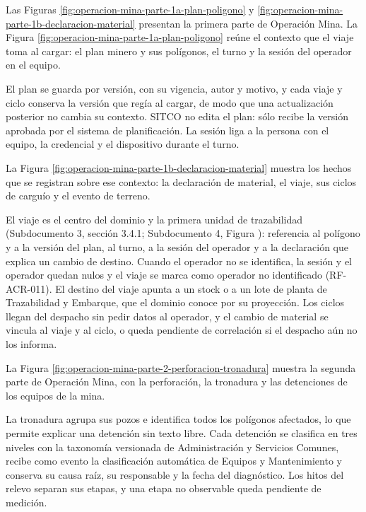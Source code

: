 \documentclass[subdoc]{../../comun/overfore}
\begin{document}
Las Figuras \ref{fig:operacion-mina-parte-1a-plan-poligono} y \ref{fig:operacion-mina-parte-1b-declaracion-material} presentan la primera parte de Operación Mina. La Figura \ref{fig:operacion-mina-parte-1a-plan-poligono} reúne el contexto que el viaje toma al cargar: el plan minero y sus polígonos, el turno y la sesión del operador en el equipo.

El plan se guarda por versión, con su vigencia, autor y motivo, y cada viaje y ciclo conserva la versión que regía al cargar, de modo que una actualización posterior no cambia su contexto. SITCO no edita el plan: sólo recibe la versión aprobada por el sistema de planificación. La sesión liga a la persona con el equipo, la credencial y el dispositivo durante el turno.

La Figura \ref{fig:operacion-mina-parte-1b-declaracion-material} muestra los hechos que se registran sobre ese contexto: la declaración de material, el viaje, sus ciclos de carguío y el evento de terreno.

El viaje es el centro del dominio y la primera unidad de trazabilidad (Subdocumento 3, sección 3.4.1; Subdocumento 4, Figura ): referencia al polígono y a la versión del plan, al turno, a la sesión del operador y a la declaración que explica un cambio de destino. Cuando el operador no se identifica, la sesión y el operador quedan nulos y el viaje se marca como operador no identificado (RF-ACR-011). El destino del viaje apunta a un stock o a un lote de planta de Trazabilidad y Embarque, que el dominio conoce por su proyección. Los ciclos llegan del despacho sin pedir datos al operador, y el cambio de material se vincula al viaje y al ciclo, o queda pendiente de correlación si el despacho aún no los informa.

La Figura \ref{fig:operacion-mina-parte-2-perforacion-tronadura} muestra la segunda parte de Operación Mina, con la perforación, la tronadura y las detenciones de los equipos de la mina.

La tronadura agrupa sus pozos e identifica todos los polígonos afectados, lo que permite explicar una detención sin texto libre. Cada detención se clasifica en tres niveles con la taxonomía versionada de Administración y Servicios Comunes, recibe como evento la clasificación automática de Equipos y Mantenimiento y conserva su causa raíz, su responsable y la fecha del diagnóstico. Los hitos del relevo separan sus etapas, y una etapa no observable queda pendiente de medición.
\end{document}
